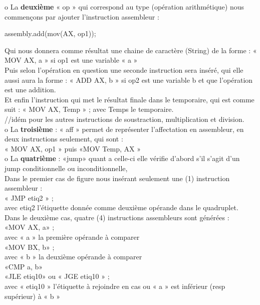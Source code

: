 \documentclass[12pt]{article}
\begin{document}
o	La \textbf{deuxième}  « op » qui correspond au type (opération arithmétique) nous commençons par ajouter l'instruction assembleur :\\

\begin{sql}
assembly.add(mov(AX, op1));
\end{sql}

Qui nous donnera comme résultat une chaine de caractère (String) de la forme : « MOV AX, a » si op1 est une variable « a »\\

Puis selon l'opération en question une seconde instruction sera inséré, qui elle aussi aura la forme : « ADD AX, b » si op2 est une variable b et que l'opération est une addition.\\
Et enfin l'instruction qui met le résultat finale dans le temporaire, qui est comme suit : « MOV AX, Temp » ; avec Temps le temporaire.\\

//idém pour les autres instructions de soustraction, multiplication et division.\\

o	La \textbf{troisième} : « aff » permet de représenter l'affectation en assembleur, en deux instructions seulement, qui sont :\\
« MOV AX, op1 » puis «MOV Temp, AX »\\

o	La \textbf{quatrième} : «jump» quant a celle-ci elle vérifie d'abord s'il s'agit d'un jump conditionnelle ou inconditionnelle,\\

Dans le premier cas de figure nous insérant seulement une (1) instruction assembleur :\\
«  JMP etiq2 » ;\\
 avec etiq2 l'étiquette donnée comme deuxième opérande dans le quadruplet.\\

Dans le deuxième cas, quatre (4) instructions assembleurs sont générées : \\
«MOV AX, a» ;\\
 avec « a » la première opérande à comparer\\
«MOV BX, b» ;\\
 avec « b » la deuxième opérande à comparer\\
«CMP a, b»\\
«JLE etiq10» ou « JGE etiq10 » ;\\
 avec « etiq10 » l'étiquette à rejoindre en cas ou « a » est inférieur (resp supérieur) à « b »\\
\end{document}
